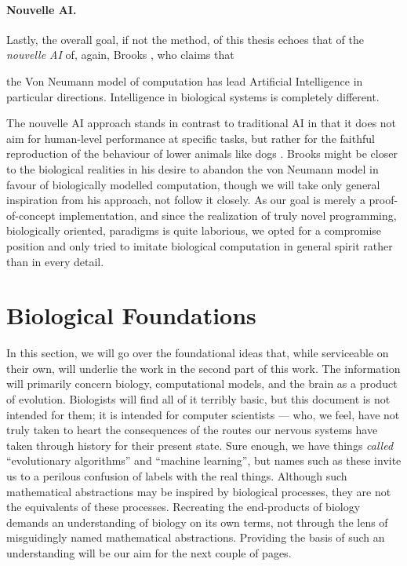 \paragraph{Nouvelle AI.} Lastly, the overall goal, if not the method, of this thesis echoes that of the {\em nouvelle AI} of, again, Brooks \cite{Brooks91intelligencewithout}, who claims that
\begin{emquote}
	the Von Neumann model of computation has lead Artificial Intelligence in particular directions. Intelligence in biological systems is completely different. 
\end{emquote}
The nouvelle AI approach stands in contrast to traditional AI in that it does not aim for human-level performance at specific tasks, but rather for the faithful reproduction of the behaviour of lower animals like dogs \cite{nouvelleAI}. Brooks might be closer to the biological realities in his desire to abandon the von Neumann model in favour of biologically modelled computation, though we will take only general inspiration from his approach, not follow it closely. As our goal is merely a proof-of-concept implementation, and since the realization of truly novel programming, biologically oriented, paradigms is quite laborious, we opted for a compromise position and only tried to imitate biological computation in general spirit rather than in every detail.

\section{Biological Foundations}\label{sec:preliminaryBiologicalConsiderations}

In this section, we will go over the foundational ideas that, while serviceable on their own, will underlie the work in the second part of this work. The information will primarily concern biology, computational models, and the brain as a product of evolution. Biologists will find all of it terribly basic, but this document is not intended for them; it is intended for computer scientists --- who, we feel, have not truly taken to heart the consequences of the routes our nervous systems have taken through history for their present state. Sure enough, we have things {\em called} ``evolutionary algorithms'' and ``machine learning'', but names such as these invite us to a perilous confusion of labels with the real things. Although such mathematical abstractions may be inspired by biological processes, they are not the equivalents of these processes. Recreating the end-products of biology demands an understanding of biology on its own terms, not through the lens of misguidingly named mathematical abstractions. Providing the basis of such an understanding will be our aim for the next couple of pages.

